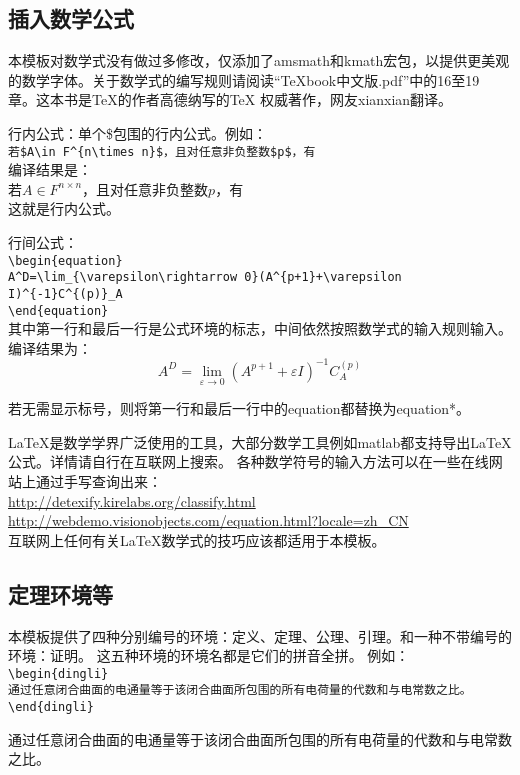 \subsection{插入数学公式}
本模板对数学式没有做过多修改，仅添加了amsmath和kmath宏包，以提供更美观的数学字体。关于数学式的编写规则请阅读“TeXbook中文版.pdf”中的16至19 章。这本书是\TeX{}的作者高德纳写的\TeX{} 权威著作，网友xianxian翻译。

行内公式：单个\$包围的行内公式。例如：\\
\verb|若$A\in F^{n\times n}$，且对任意非负整数$p$，有|\\
编译结果是：\\
若$A\in F^{n\times n}$，且对任意非负整数$p$，有\\
这就是行内公式。

行间公式：\\
\verb|\begin{equation}|\\
\verb|A^D=\lim_{\varepsilon\rightarrow 0}(A^{p+1}+\varepsilon I)^{-1}C^{(p)}_A|\\
\verb|\end{equation}|\\
其中第一行和最后一行是公式环境的标志，中间依然按照数学式的输入规则输入。\\
编译结果为：\\
\begin{equation}
A^D=\lim_{\varepsilon\rightarrow 0}(A^{p+1}+\varepsilon I)^{-1}C^{(p)}_A
\end{equation}

若无需显示标号，则将第一行和最后一行中的equation都替换为equation*。

\LaTeX 是数学学界广泛使用的工具，大部分数学工具例如matlab都支持导出LaTeX公式。详情请自行在互联网上搜索。
各种数学符号的输入方法可以在一些在线网站上通过手写查询出来：\\\url{http://detexify.kirelabs.org/classify.html}\\
\url{http://webdemo.visionobjects.com/equation.html?locale=zh_CN}\\
互联网上任何有关LaTeX数学式的技巧应该都适用于本模板。

\subsection{定理环境等}
本模板提供了四种分别编号的环境：定义、定理、公理、引理。和一种不带编号的环境：证明。
这五种环境的环境名都是它们的拼音全拼。
例如：\\
\verb|\begin{dingli}|\\
\verb|通过任意闭合曲面的电通量等于该闭合曲面所包围的所有电荷量的代数和与电常数之比。|\\
\verb|\end{dingli}|\\
\begin{dingli}
通过任意闭合曲面的电通量等于该闭合曲面所包围的所有电荷量的代数和与电常数之比。
\end{dingli}

